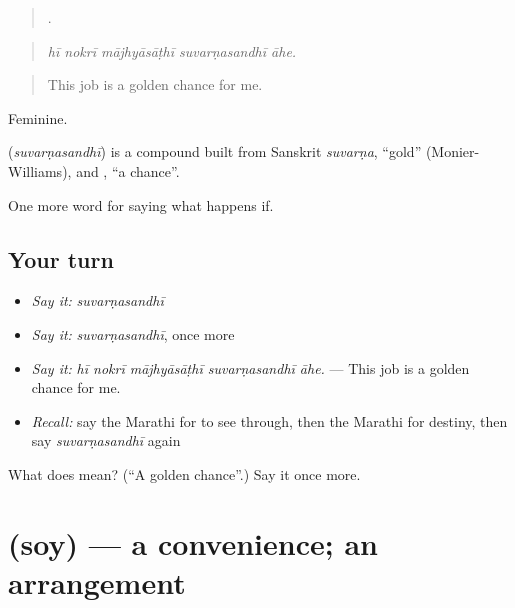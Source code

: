 \begin{quote}
    .
\end{quote}

\begin{quote}
\emph{hī nokrī mājhyāsāṭhī suvarṇasandhī āhe.}
\end{quote}

\begin{quote}
This job is a golden chance for me.
\end{quote}

Feminine.

\begin{cousinweb}
\textbf{} (\emph{suvarṇasandhī}) is a compound built from Sanskrit \emph{suvarṇa}, \textquotedblleft{}gold\textquotedblright{} (Monier-Williams), and , \textquotedblleft{}a chance\textquotedblright{}.
\end{cousinweb}

\begin{grammarlens}[title={What you've built}]
One more word for saying what happens if.
\end{grammarlens}

\subsection*{Your turn}
\begin{itemize}
\raggedright
  \item \emph{Say it:} \emph{suvarṇasandhī}
  \item \emph{Say it:} \emph{suvarṇasandhī}, once more
  \item \emph{Say it:} \emph{hī nokrī mājhyāsāṭhī suvarṇasandhī āhe.} — This job is a golden chance for me.
  \item \emph{Recall:} say the Marathi for to see through, then the Marathi for destiny, then say \emph{suvarṇasandhī} again
\end{itemize}

\begin{tcolorbox}[breakable,colback=teal!4,colframe=teal!35!black,title={Before you move on}]
What does  mean? (\textquotedblleft{}A golden chance\textquotedblright{}.) Say it once more.
\end{tcolorbox}
\section[\texorpdfstring{\mr{सोय} (soy)}{सोय (soy)}]{ (soy) — a convenience; an arrangement}

